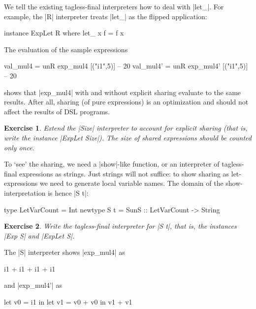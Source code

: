\documentclass[submission,copyright,creativecommons]{eptcs}
\newtheorem{Exercise}{Exercise} \newcommand\aside[1]{}
\begin{document}
We tell the existing tagless-final interpreters how to deal with
|let_|. For example, the |R| interpreter treats |let_| as the flipped
application:
\begin{code}
instance ExpLet R where
  let_ x f = f x
\end{code}
The evaluation of the sample expressions
\begin{code}
val_mul4  = unR exp_mul4  [("i1",5)] -- 20
val_mul4' = unR exp_mul4' [("i1",5)] -- 20
\end{code}
shows that |exp_mul4| with and without explicit sharing evaluate to
the same results. After all, sharing (of pure expressions) is an
optimization and should not affect the results of DSL programs.
\begin{Exercise}
Extend the |Size| interpreter to account for explicit sharing
(that is, write the instance |ExpLet Size|). The size of shared
expressions should be counted only once.
\end{Exercise}

To `see' the sharing, we need a |show|-like function, or an
interpreter of tagless-final expressions as strings. Just strings will
not suffice: to show sharing as let-expressions we need to generate
local variable names. The domain of the show-interpretation is hence
|S t|:
\begin{code}
type LetVarCount = Int
newtype S t = S{unS :: LetVarCount -> String}
\end{code}
\begin{Exercise}
Write the tagless-final interpreter for |S t|, that is, 
the instances |Exp S| and |ExpLet S|.
\end{Exercise}
The |S| interpreter shows |exp_mul4| as
\begin{code}
i1 + i1 + i1 + i1
\end{code}
and |exp_mul4'| as
\begin{code}
let v0 = i1 in let v1 = v0 + v0 in v1 + v1
\end{code}
\end{document}
